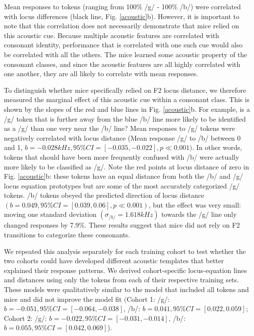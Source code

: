 Mean responses to tokens (ranging from 100\% /g/ - 100\% /b/) were correlated with locus differences (black line, Fig. \ref{acoustic}b). However, it is important to note that this correlation does not necessarily demonstrate that mice relied on this acoustic cue. Because multiple acoustic features are correlated with consonant identity, performance that is correlated with one such cue would also be correlated with all the others. The mice learned some acoustic property of the consonant classes, and since the acoustic features are all highly correlated with one another, they are all likely to correlate with mean responses.

To distinguish whether mice specifically relied on F2 locus distance, we therefore measured the marginal effect of this acoustic cue within a consonant class. This is shown by the slopes of the red and blue lines in Fig. \ref{acoustic}b. For example, is a /g/ token that is further away from the blue /b/ line more likely to be identified as a /g/ than one very near the /b/ line? Mean responses to /g/ tokens were negatively correlated with locus distance (Mean response /g/ to /b/ between 0 and 1, $b=-0.028kHz, 95\% CI = [-0.035, -0.022], p \ll 0.001)$. In other words, tokens that should have been more frequently confused with /b/ were actually more likely to be classified as /g/. Note the red points at locus distance of zero in Fig. \ref{acoustic}b: these tokens have an equal distance from both the /b/ and /g/ locus equation prototypes but are some of the most accurately categorized /g/ tokens. /b/ tokens obeyed the predicted direction of locus distance $ (b=0.049, 95\% CI = [0.039, 0.06], p \ll 0.001) $, but the effect was very small: moving one standard deviation $ (\sigma_{/b/}=1.618kHz) $ towards the /g/ line only changed responses by 7.9\%. These results suggest that mice did not rely on F2 transitions to categorize these consonants.

We repeated this analysis separately for each training cohort to test whether the two cohorts could have developed different acoustic templates that better explained their response patterns. We derived cohort-specific locus-equation lines and distances using only the tokens from each of their respective training sets. These models were qualitatively similar to the model that included all tokens and mice and did not improve the model fit $($Cohort 1: /g/: $b=-0.051, 95\% CI = [-0.064, -0.038]$, /b/: $b=0.041, 95\% CI = [0.022, 0.059]$; Cohort 2: /g/: $b=-0.022, 95\% CI = [-0.031, -0.014]$, /b/: $b=0.055, 95\% CI = [0.042, 0.069]$).

